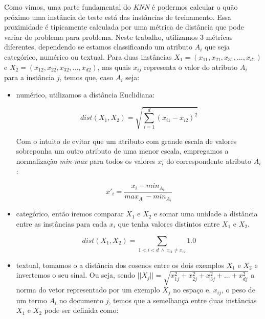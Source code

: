 Como vimos, uma parte fundamental do \textit{KNN} é podermos calcular o quão próximo uma instância de teste está das instâncias de treinamento. 
Essa proximidade é tipicamente calculada por uma métrica de distância que pode variar de problema para problema. Neste trabalho, utilizamos 3 métricas diferentes, dependendo se estamos classificando um atributo $A_i$ que seja categórico, numérico ou textual. Para duas instâncias $X_1 =  (x_{11}, x_{21}, x_{31}, ..., x_{d1})$ e $X_2 = (x_{12}, x_{22}, x_{32}, ..., x_{d2})$, nas quais $x_{ij}$ representa o valor do atributo $A_i$ para a instância $j$, temos que, caso $A_i$ seja:

\begin{itemize}

\item numérico, utilizamos a distância Euclidiana:

\begin{equation}\label{eqn::distancia_euclidiana}
    dist(X_1, X_2) =  \sqrt{\sum_{i=1}^d (x_{i1}-x_{i2})^2}
\end{equation}

    Com o intuito de evitar que um atributo com grande escala de valores sobreponha um outro atributo de uma menor escala, empregamos a normalização \textit{min-max} para todos os valores $x_i$ do correspondente atributo $A_i$: 

\begin{equation}\label{eqn::distancia_euclidiana}
    x'_{i} =  \frac{x_{i} - min_{A_i}}{ max_{A_i} - min_{A_i} }
\end{equation}

\item categórico, então iremos comparar $X_1$ e $X_2$ e somar uma unidade a distância entre as instâncias para cada $x_i$ que tenha valores distintos entre $X_1$ e $X_2$.

\begin{equation}\label{eqn::distancia_cat}
   dist(X_1, X_2) = \sum_{1 < i < d \ \wedge \ x_{i1} \neq x_{i2}} 1.0
\end{equation}

\item textual, tomamos o a distância dos cosenos entre os dois exemplos $X_1$ e $X_2$ e invertemos o seu sinal. Ou seja, sendo $||X_j|| = \sqrt{x_{1j}^2 + x_{2j}^2 + x_{3j}^2 + ... + x_{dj}^2}$ a norma do vetor representado por um exemplo $X_j$ no espaço e, $x_{ij}$, o peso de um termo $A_i$ no documento $j$, temos que a semelhança entre duas instâncias $X_1$ e $X_2$ pode ser definida como:


\end{itemize}
